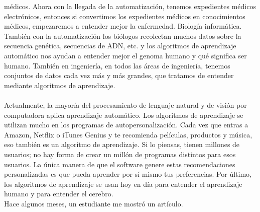 \documentclass{book}
\begin{document}
médicos. Ahora con la llegada de la automatización, tenemos expedientes médicos electrónicos, entonces si
convertimos los expedientes médicos en conocimientos médicos, empezaremos a entender mejor
la enfermedad. Biología informática. También con la automatización los biólogos
recolectan muchos datos sobre la secuencia genética, secuencias de ADN, etc.
y los algoritmos de aprendizaje automático nos ayudan a entender mejor el genoma
humano y qué significa ser humano. También en ingeniería, en todos las áreas de
ingeniería, tenemos conjuntos de datos cada vez más y más grandes, que
tratamos de entender mediante algoritmos de aprendizaje.\\\\ Actualmente, la mayoría del procesamiento de
lenguaje natural y de visión por computadora aplica aprendizaje automático. Los algoritmos de
aprendizaje se utilizan mucho en los programas de autopersonalización. Cada vez que entras a
Amazon, Netflix o iTunes Genius y te recomienda películas, productos y música,
eso también es un algoritmo de aprendizaje. Si lo piensas, tienen millones de usuarios;
no hay forma de crear un millón de programas distintos para esos usuarios.
La única manera de que el software genere estas recomendaciones personalizadas es
que pueda aprender por sí mismo tus preferencias. Por último, los algoritmos
de aprendizaje se usan hoy en día para entender el aprendizaje humano
y para entender el cerebro.\\ Hace algunos meses, un estudiante me mostró un artículo.
\end{document}
